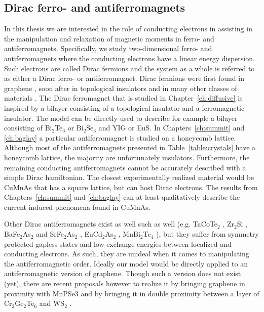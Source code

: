 \subsection{Dirac ferro- and antiferromagnets}
In this thesis we are interested in the role of conducting electrons in assisting in the manipulation and relaxation of magnetic moments in ferro- and antiferromagnets. Specifically, we study two-dimensional ferro- and antiferromagnets where the conducting electrons have a linear energy dispersion. Such electrons are called Dirac fermions and the system as a whole is referred to as either a Dirac ferro- or antiferromagnet. Dirac fermions were first found in graphene \cite{novoselov_electric_2004, novoselov_two-dimensional_2005-1, novoselov_two-dimensional_2005}, soon after in topological insulators \cite{?} and in many other classes of materials \cite{?}. The Dirac ferromagnet that is studied in Chapter~\ref{ch:diffusive} is inspired by a bilayer consisting of a topological insulator and a ferromagnetic insulator. The model can be directly used to describe for example a bilayer consisting of Bi$_2$Te$_3$ or Bi$_2$Se$_3$ and YIG or EuS. In Chapters~\ref{ch:summit} and \ref{ch:baglay} a particular antiferromagnet is studied on a honeycomb lattice. Although most of the antiferromagnets presented in Table~\ref{table:crystals} have a honeycomb lattice, the majority are unfortunately insulators. Furthermore, the remaining conducting antiferromagnets cannot be accurately described with a simple Dirac hamiltonian. The closest experimentally realized material would be CuMnAs that has a square lattice, but can host Dirac electrons. The results from Chapters~\ref{ch:summit} and \ref{ch:baglay} can at least qualitatively describe the current induced phenomena found in CuMnAs.

Other Dirac antiferromagnets exist as well such as well (e.g. TaCoTe$_2$ \cite{wang_antiferromagnetic_2017}, Zr$_2$Si \cite{shao_zr2si_2018}
, BaFe$_2$As$_2$ and SrFe$_2$As$_2$ \cite{chen_two-dimensional_2017}, EuCd$_2$As$_2$ \cite{ma_emergence_2020}, MnBi$_2$Te$_4$ \cite{swatek_gapless_2020}), but they suffer from symmetry protected gapless states and low exchange energies between localized and conducting electrons. As such, they are unideal when it comes to manipulating the antiferromagnetic order. Ideally our model would be directly applied to an antiferromagnetic version of graphene. Though such a version does not exist (yet), there are recent proposals however to realize it by bringing graphene in proximity with MnPSe3 \cite{hogl_quantum_2020} and by bringing it in double proximity between a layer of Cr$_2$Ge$_2$Te$_6$ and WS$_2$ \cite{zollner_purely_2019}.

